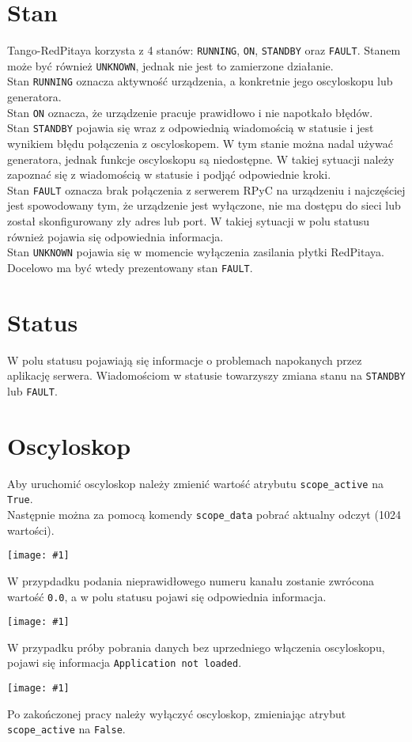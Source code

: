 \documentclass[12pt,a4paper]{article}
\newcommand{\screenshot}[1]{\begin{minipage}[c]{\textwidth}\texttt{[image: \#1]}\end{minipage}}
\begin{document}
	\section{Stan}
	Tango-RedPitaya korzysta z 4 stanów: \texttt{RUNNING}, \texttt{ON}, \texttt{STANDBY} oraz \texttt{FAULT}.
	Stanem może być również \texttt{UNKNOWN}, jednak nie jest to zamierzone działanie.\\
	Stan \texttt{RUNNING} oznacza aktywność urządzenia, a konkretnie jego oscyloskopu lub generatora.\\
	Stan \texttt{ON} oznacza, że urządzenie pracuje prawidłowo i nie napotkało błędów.\\
	Stan \texttt{STANDBY} pojawia się wraz z odpowiednią wiadomością w statusie i jest wynikiem błędu połączenia z oscyloskopem.
	W tym stanie można nadal używać generatora, jednak funkcje oscyloskopu są niedostępne. W takiej sytuacji należy zapoznać się z wiadomością w statusie i podjąć odpowiednie kroki.\\
	Stan \texttt{FAULT} oznacza brak połączenia z serwerem RPyC na urządzeniu i najczęściej jest spowodowany tym, że urządzenie jest wyłączone, nie ma dostępu do sieci lub został skonfigurowany zły adres lub port. W takiej sytuacji w polu statusu również pojawia się odpowiednia informacja.\\
	Stan \texttt{UNKNOWN} pojawia się w momencie wyłączenia zasilania płytki RedPitaya. Docelowo ma być wtedy prezentowany stan \texttt{FAULT}.

	\section{Status}
	W polu statusu pojawiają się informacje o problemach napokanych przez aplikację serwera. Wiadomościom w statusie towarzyszy zmiana stanu na \texttt{STANDBY} lub \texttt{FAULT}.\\

	\section{Oscyloskop}
	Aby uruchomić oscyloskop należy zmienić wartość atrybutu \texttt{scope\_active} na \texttt{True}.\\
	Następnie można za pomocą komendy \texttt{scope\_data} pobrać aktualny odczyt (1024 wartości).\\
	\screenshot{screenshots/scope_data.png}
	W przypdadku podania nieprawidłowego numeru kanału zostanie zwrócona wartość \texttt{0.0}, a w polu statusu pojawi się odpowiednia informacja.\\
	\screenshot{screenshots/invalid_channel.png}
	W przypadku próby pobrania danych bez uprzedniego włączenia oscyloskopu, pojawi się informacja \texttt{Application not loaded}.\\
	\screenshot{screenshots/scope_inactive.png}
	Po zakończonej pracy należy wyłączyć oscyloskop, zmieniając atrybut \texttt{scope\_active} na \texttt{False}.
\end{document}
